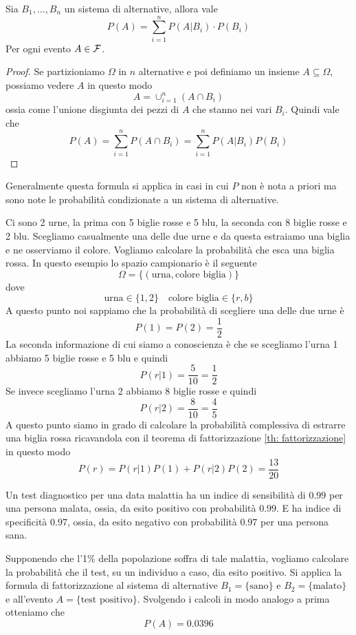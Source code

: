 \begin{theorem}[Fattorizzazione]\label{th: fattorizzazione}
	Sia $B_1, ..., B_n$ un sistema di alternative, allora vale
	\[ P(A) = \sum_{i=1}^n P(A | B_i) \cdot P(B_i) \]
	Per ogni evento $A \in \mathcal{F}$.
	\begin{proof}
		Se partizioniamo $\Omega$ in $n$ alternative e poi definiamo un insieme
		$A \subseteq \Omega$, possiamo vedere $A$ in questo modo
		\[ A = \cup_{i=1}^n (A \cap B_i) \]
		ossia come l'unione disgiunta dei pezzi di $A$ che stanno nei vari $B_i$. Quindi vale che
		\[ P(A) = \sum_{i=1}^n P(A \cap B_i) = \sum_{i=1}^n P(A | B_i) P(B_i) \]
	\end{proof}
\end{theorem}

Generalmente questa formula si applica in casi in cui $P$ non è nota a priori ma sono note le
probabilità condizionate a un sistema di alternative.

\begin{example}
	Ci sono 2 urne, la prima con 5 biglie rosse e 5 blu, la seconda con 8 biglie rosse e 2 blu.
	Scegliamo casualmente una delle due urne e da questa estraiamo una biglia e ne osserviamo il
	colore. Vogliamo calcolare la probabilità che esca una biglia rossa. In questo esempio lo
	spazio campionario è il seguente
	\[ \Omega = \{ (\text{urna}, \text{colore biglia}) \} \]
	dove
	\[ \text{urna} \in \{ 1, 2 \} \quad \text{colore biglia} \in \{ r, b \} \]
	A questo punto noi sappiamo che la probabilità di scegliere una delle due urne è
	\[ P(1) = P(2) = \frac{1}{2} \]
	La seconda informazione di cui siamo a conoscienza è che se scegliamo l'urna 1 abbiamo 5
	biglie rosse e 5 blu e quindi
	\[ P(r | 1) = \frac{5}{10} = \frac{1}{2} \]
	Se invece scegliamo l'urna 2 abbiamo 8 biglie rosse e quindi
	\[ P(r | 2) = \frac{8}{10} = \frac{4}{5} \]
	A questo punto siamo in grado di calcolare la probabilità complessiva di estrarre una biglia
	rossa ricavandola con il teorema di fattorizzazione \ref{th: fattorizzazione} in questo modo
	\[ P(r) = P(r | 1) P(1) + P(r | 2) P(2) = \frac{13}{20} \]
\end{example}

\begin{example}
	Un test diagnostico per una data malattia ha un indice di sensibilità di $0.99$ per una
	persona malata, ossia, da esito positivo con probabilità $0.99$. E ha indice di specificità
	$0.97$, ossia, da esito negativo con probabilità $0.97$ per una persona sana.

	Supponendo che l'1\% della popolazione soffra di tale malattia, vogliamo calcolare la
	probabilità che il test, su un individuo a caso, dia esito positivo. Si applica la formula di
	fattorizzazione al sistema di alternative $B_1 = \{ \text{sano} \}$ e
	$B_2 = \{ \text{malato} \}$ e all'evento $A = \{ \text{test positivo} \}$. Svolgendo i calcoli
	in modo analogo a prima otteniamo che
	\[ P(A) = 0.0396 \]
\end{example}

